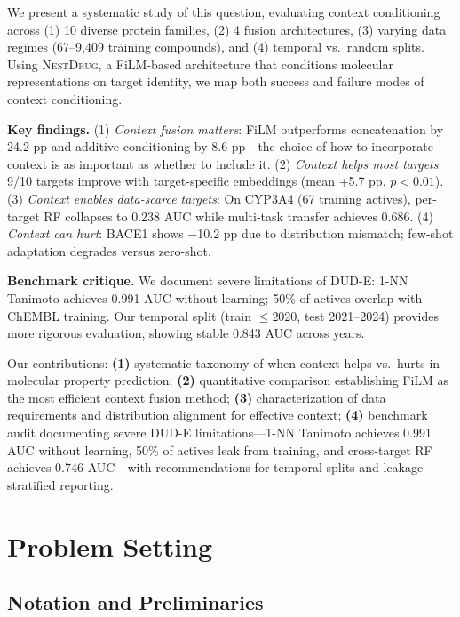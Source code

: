 \documentclass{article}
\newcommand{\methodname}{\textsc{NestDrug}}
\begin{document}
We present a systematic study of this question, evaluating context conditioning across (1) 10 diverse protein families, (2) 4 fusion architectures, (3) varying data regimes (67--9,409 training compounds), and (4) temporal vs.\ random splits. Using \methodname{}, a FiLM-based architecture \citep{perez_2018_film} that conditions molecular representations on target identity, we map both success and failure modes of context conditioning.

\textbf{Key findings.} (1) \textit{Context fusion matters}: FiLM outperforms concatenation by 24.2 pp and additive conditioning by 8.6 pp---the choice of how to incorporate context is as important as whether to include it. (2) \textit{Context helps most targets}: 9/10 targets improve with target-specific embeddings (mean +5.7 pp, $p < 0.01$). (3) \textit{Context enables data-scarce targets}: On CYP3A4 (67 training actives), per-target RF collapses to 0.238 AUC while multi-task transfer achieves 0.686. (4) \textit{Context can hurt}: BACE1 shows $-$10.2 pp due to distribution mismatch; few-shot adaptation degrades versus zero-shot.

\textbf{Benchmark critique.} We document severe limitations of DUD-E: 1-NN Tanimoto achieves 0.991 AUC without learning; 50\% of actives overlap with ChEMBL training. Our temporal split (train $\leq$2020, test 2021--2024) provides more rigorous evaluation, showing stable 0.843 AUC across years.

Our contributions: \textbf{(1)} systematic taxonomy of when context helps vs.\ hurts in molecular property prediction; \textbf{(2)} quantitative comparison establishing FiLM as the most efficient context fusion method; \textbf{(3)} characterization of data requirements and distribution alignment for effective context; \textbf{(4)} benchmark audit documenting severe DUD-E limitations---1-NN Tanimoto achieves 0.991 AUC without learning, 50\% of actives leak from training, and cross-target RF achieves 0.746 AUC---with recommendations for temporal splits and leakage-stratified reporting.

\section{Problem Setting}
\label{sec:problem}

\subsection{Notation and Preliminaries}
\end{document}
